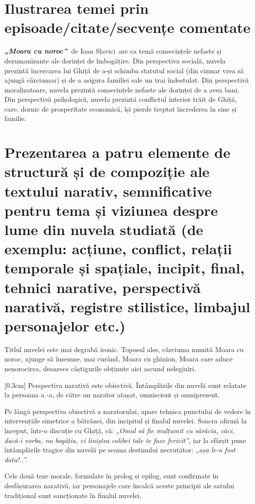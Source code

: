 \documentclass[
12pt,
a4paper
]{article}
\newcommand{\rom}[1]{\uppercase\expandafter{\romannumeral #1\relax}} %
\newcommand{\operatitle}{\textbf{\textit{„Moara cu noroc”\ }}} %
\newcommand{\operaauthor}{Ioan Slavici\ }                               %
\begin{document}
\section{Ilustrarea temei prin episoade/citate/secvențe comentate}

\operatitle de \operaauthor are ca temă consecințele nefaste și dezumanizante ale dorinței de îmbogățire. Din perspectiva socială, nuvela prezintă încercarea lui Ghiță de a-și schimba statutul social (din cizmar vrea să ajungă cârciumar) și de a asigura familiei sale un trai îndestulat. Din perspectivă moralizatoare, nuvela prezintă consecințele nefaste ale dorinței de a avea bani. Din perspectivă psihologică, nuvela prezintă conflictul interior trăit de Ghiță, care, dornic de prosperitate economică, își pierde treptat încrederea în sine și familie.

\section{Prezentarea a patru elemente de structură și de compoziție ale textului narativ, semnificative pentru tema și viziunea despre lume din nuvela studiată {\footnotesize(de exemplu: acțiune, conflict, relații temporale și spațiale, incipit, final, tehnici narative, perspectivă narativă, registre stilistice, limbajul personajelor etc.)}}

Titlul nuvelei este mai degrabă ironic. Toposul ales, cârciuma numită Moara cu noroc, ajunge să însemne, mai curând, Moara cu ghinion, Moara care aduce nenorocirea, deoarece câștigurile obținute aici ascund nelegiuiri.

[0.3cm]
Perspectiva narativă este obiectivă. Întâmplările din nuvelă sunt relatate la persoana a \rom{3}-a, de către un narator atașat, omniscient și omniprezent.

Pe lângă perspectiva obiectivă a naratorului, apare tehnica punctului de vedere în intervențiile simetrice a bătrânei, din incipitul și finalul nuvelei. Soacra afirmă la început, într-o discuție cu Ghiță, că: \textit{„Omul să fie mulțumit cu sărăcia, căci, dacă-i vorba, nu bogăția, ci liniștea colibei tale te face fericit”}, iar la sfârșit pune întâmplările tragice din nuvelă pe seama destinului necruțător: \textit{„așa le-a fost data!..”}.

Cele două teze morale, formulate în prolog și epilog, sunt confirmate în desfășurarea narativă, iar personajele care încalcă aceste principii ale satului tradițional sunt sanc\-ți\-o\-na\-te în finalul nuvelei.
\end{document}
